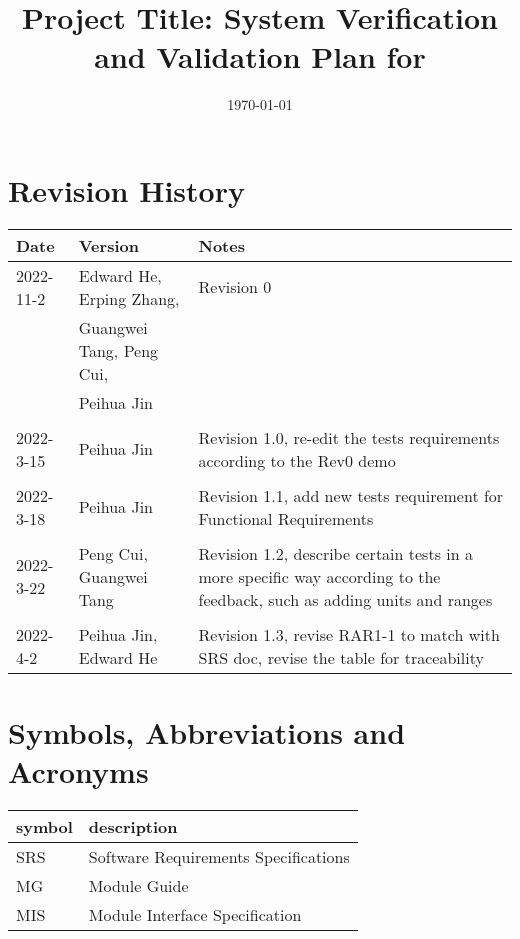 \documentclass[12pt, titlepage]{article}
\begin{document}
\title{Project Title: System Verification and Validation Plan for \progname{}} 
\author{\authname}
\date{\today}
	
\maketitle


\section{Revision History}

\begin{tabularx}{\textwidth}{p{3cm}p{3cm}X}
\toprule {\bf Date} & {\bf Version} & {\bf Notes}\\
\midrule
2022-11-2 & Edward He, Erping Zhang, & Revision 0\\
& Guangwei Tang, Peng Cui, & \\
& Peihua Jin & \\
\\
2022-3-15 & Peihua Jin & Revision 1.0, re-edit the tests requirements according to the Rev0 demo\\
\\
2022-3-18 & Peihua Jin & Revision 1.1, add new tests requirement for Functional Requirements\\
\\
2022-3-22 & Peng Cui, Guangwei Tang & Revision 1.2, describe certain tests in a more specific way according to the feedback, such as adding units and ranges\\
\\
2022-4-2 & Peihua Jin, Edward He & Revision 1.3, revise RAR1-1 to match with SRS doc, revise the table for traceability\\



\bottomrule
\end{tabularx}

\newpage

\tableofcontents

\listoftables


\newpage

\section{Symbols, Abbreviations and Acronyms}

\renewcommand{\arraystretch}{1.2}
\begin{tabular}{l l} 
  \toprule		
  \textbf{symbol} & \textbf{description}\\
  \midrule 
  SRS & Software Requirements Specifications\\
  MG & Module Guide\\
  MIS & Module Interface Specification\\
  \bottomrule
\end{tabular}\\
\end{document}
